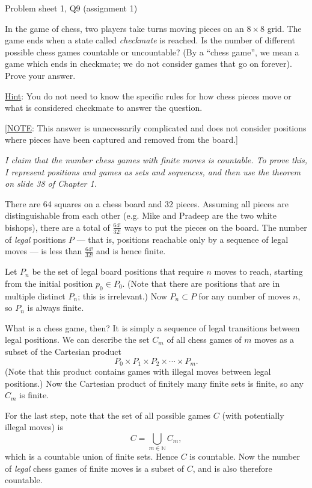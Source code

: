 \begin{problem}{Problem sheet 1, Q9 (assignment 1)}{}


    In the game of chess, two players take turns moving pieces on an $8 \times 8$ grid.  The game ends when a state called \textit{checkmate} is reached.  Is the number of different possible chess games countable or uncountable?  (By a ``chess game'', we mean a game which ends in checkmate; we do not consider games that go on forever). Prove your answer.
    
    \underline{Hint}: You do not need to know the specific rules for how chess pieces move or what is considered checkmate to answer the question.

    \tcblower

    [\underline{NOTE}: This answer is unnecessarily complicated and does not consider positions where pieces have been captured and removed from the board.]

    \textit{I claim that the number chess games with finite moves is countable. To prove this, I represent positions and games as sets and sequences, and then use the theorem on slide 38 of Chapter 1.}
        
    There are 64 squares on a chess board and 32 pieces. Assuming all pieces are distinguishable from each other (e.g. Mike and Pradeep are the two white bishops), there are a total of $\frac{64!}{32!}$ ways to put the pieces on the board. The number of \textit{legal} positions $P$ --- that is, positions reachable only by a sequence of legal moves --- is less than $\frac{64!}{32!}$ and is hence finite.

    Let $P_n$ be the set of legal board positions that require $n$ moves to reach, starting from the initial position $p_0 \in P_0$. (Note that there are positions that are in multiple distinct $P_n$; this is irrelevant.) Now $P_n \subset P$ for any number of moves $n$, so $P_n$ is always finite.

    What is a chess game, then? It is simply a sequence of legal transitions between legal positions. We can describe the set $C_m$ of all chess games of $m$ moves as a subset of the Cartesian product
        $$ P_0 \times P_1 \times P_2 \times \cdots \times P_m . $$
    (Note that this product contains games with illegal moves between legal positions.) Now the Cartesian product of finitely many finite sets is finite, so any $C_m$ is finite.

    For the last step, note that the set of all possible games $C$ (with potentially illegal moves) is 
        $$ C = \bigcup_{m \in \mathbb{N}} C_m , $$
    which is a countable union of finite sets. Hence $C$ is countable. Now the number of \textit{legal} chess games of finite moves is a subset of $C$, and is also therefore countable.
\end{problem}

